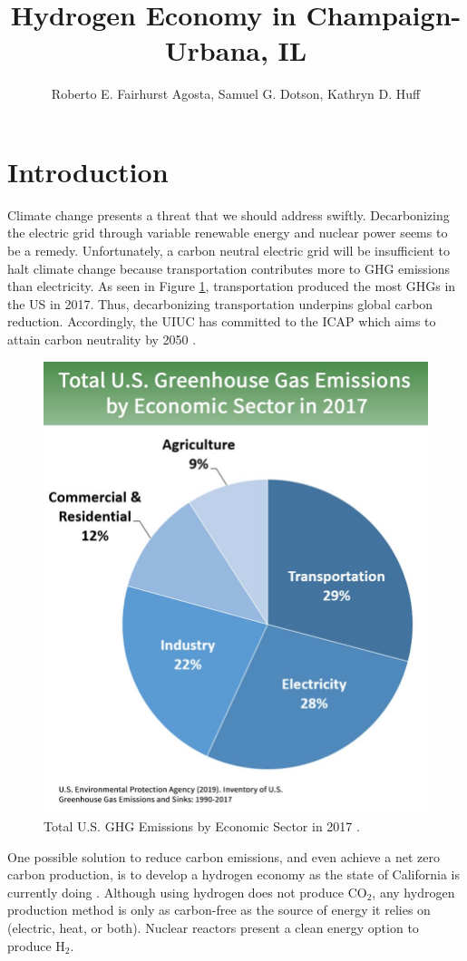 \documentclass{anstrans}
\title{Hydrogen Economy in Champaign-Urbana, IL}
\author{Roberto E. Fairhurst Agosta, Samuel G. Dotson, Kathryn D. Huff}
\institute{
University of Illinois at Urbana-Champaign, Dept. of Nuclear, Plasma, and Radiological Engineering\\
ref3@illinois.edu
}
\begin{document}
\section{Introduction}

Climate change presents a threat that we should address swiftly. Decarbonizing the electric grid through variable renewable energy and nuclear power seems to be a remedy.
Unfortunately, a carbon neutral electric grid will be insufficient to halt climate change because transportation contributes more to \gls{GHG} emissions than electricity.
As seen in Figure \ref{fig:ghg}, transportation produced the most \glspl{GHG} in the US in 2017. Thus, decarbonizing transportation underpins global carbon reduction.
Accordingly, the \gls{UIUC} has committed to the \gls{ICAP} which aims to attain carbon neutrality by 2050 \cite{university_of_illinois_at_urbana-champaign_illlinois_2015}.

\begin{figure}[H]
	\centering
	\includegraphics[width=0.7\linewidth]{figures/total-ghg-2019-caption.jpg}
	\hfill
	\caption{Total U.S. GHG Emissions by Economic Sector in 2017 \cite{us_epa_sources_2020}.}
	\label{fig:ghg}
\end{figure}

One possible solution to reduce carbon emissions, and even achieve a net zero carbon production, is to develop a hydrogen economy as the state of California is currently doing \cite{brown_economic_2013}. 
Although using hydrogen does not produce CO$_2$, any hydrogen production method is only as carbon-free as the source of energy it relies on (electric, heat, or both).
Nuclear reactors present a clean energy option to produce H$_2$.
\end{document}
